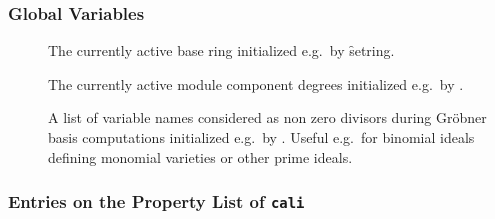 \subsubsection*{Global Variables}

\begin{description}
\item[]
\hypertarget{variable:CALI!=BASERING}{}
The currently active base ring initialized e.g.\ by
\f{setring}.

\item[]
\hypertarget{variable:CALI!=DEGREES}{}
The currently active module component degrees initialized e.g.\
by .

\item[]
\hypertarget{variable:CALI!=MONSET}{}
A list of variable names considered as non zero divisors during
Gr\"obner basis computations initialized e.g.\ by . Useful
e.g.\ for binomial ideals defining monomial varieties or other prime
ideals.

\end{description}

\subsubsection*{Entries on the Property List of \texttt{cali}}

